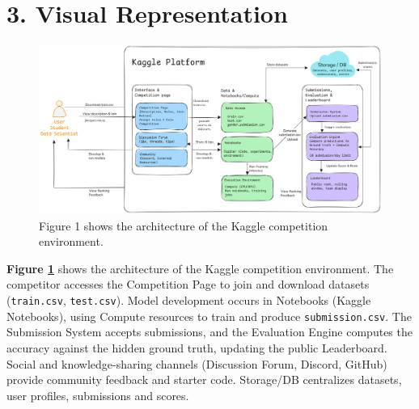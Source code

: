 \documentclass[12pt]{report}
\begin{document}
\section*{3. Visual Representation}


\begin{figure}[h!]
    \centering
    \includegraphics[width=\linewidth]{Figure1.png}
    \caption{Figure 1 shows the architecture of the Kaggle competition environment.}
    \label{fig:system-architecture}
\end{figure}

\noindent
\textbf{Figure \ref{fig:system-architecture}} shows the architecture of the Kaggle competition environment. 
The competitor accesses the Competition Page to join and download datasets (\texttt{train.csv}, \texttt{test.csv}). 
Model development occurs in Notebooks (Kaggle Notebooks), using Compute resources to train and produce \texttt{submission.csv}. 
The Submission System accepts submissions, and the Evaluation Engine computes the accuracy against the hidden ground truth, updating the public Leaderboard. 
Social and knowledge-sharing channels (Discussion Forum, Discord, GitHub) provide community feedback and starter code. 
Storage/DB centralizes datasets, user profiles, submissions and scores.
\end{document}
